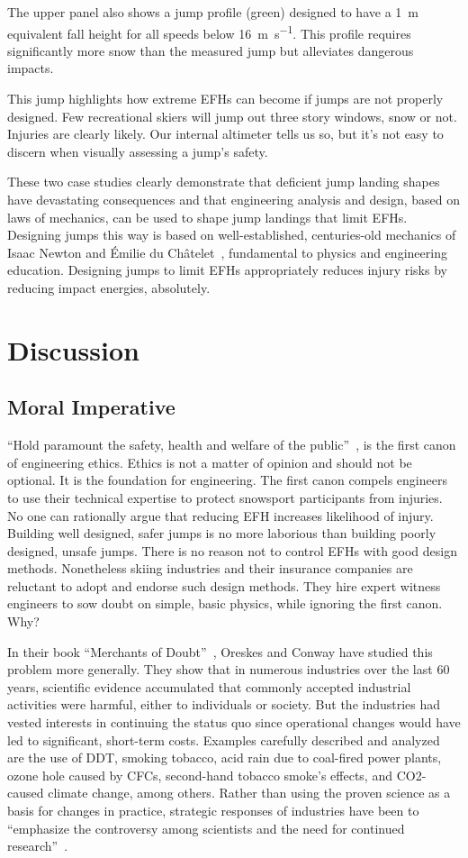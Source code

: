 \documentclass[smallextended]{svjour3}       %
\begin{document}
The upper panel also shows a jump profile (green) designed to have a
1~\si{\meter} equivalent fall height for all speeds below
16~\si{\meter\per\second}. This profile requires significantly more snow than
the measured jump but alleviates dangerous impacts.

This jump highlights how extreme EFHs can become if jumps are not properly
designed. Few recreational skiers will jump out three story windows, snow or
not. Injuries are clearly likely. Our internal altimeter tells us so, but it's
not easy to discern when visually assessing a jump's safety.

These two case studies clearly demonstrate that deficient jump landing shapes
have devastating consequences and that engineering analysis and design, based
on laws of mechanics, can be used to shape jump landings that limit EFHs.
Designing jumps this way is based on well-established, centuries-old mechanics
of Isaac Newton and Émilie du Châtelet~\cite{Zinsser2007}, fundamental to
physics and engineering education. Designing jumps to limit EFHs appropriately
reduces injury risks by reducing impact energies, absolutely.
\section{Discussion}
\subsection{Moral Imperative}
\label{sec:moral}
%
``Hold paramount the safety, health and welfare of the
public''~\cite{NSPE2019}, is the first canon of engineering ethics. Ethics is
not a matter of opinion and should not be optional. It is the foundation for
engineering. The first canon compels engineers to use their technical expertise
to protect snowsport participants from injuries. No one can rationally argue
that reducing EFH increases likelihood of injury. Building well designed, safer
jumps is no more laborious than building poorly designed, unsafe jumps. There
is no reason not to control EFHs with good design methods. Nonetheless skiing
industries and their insurance companies are reluctant to adopt and endorse
such design methods. They hire expert witness engineers to sow doubt on simple,
basic physics, while ignoring the first canon. Why?

In their book ``Merchants of Doubt''~\cite{Oreskes2010}, Oreskes and Conway
have studied this problem more generally. They show that in numerous industries
over the last 60 years, scientific evidence accumulated that commonly accepted
industrial activities were harmful, either to individuals or society. But the
industries had vested interests in continuing the status quo since operational
changes would have led to significant, short-term costs. Examples carefully
described and analyzed~\cite{Oreskes2010} are the use of DDT, smoking tobacco,
acid rain due to coal-fired power plants, ozone hole caused by CFCs,
second-hand tobacco smoke’s effects, and CO2-caused climate change, among
others. Rather than using the proven science as a basis for changes in
practice, strategic responses of industries have been to ``emphasize the
controversy among scientists and the need for continued
research''~\cite{Oreskes2010}.
\end{document}
